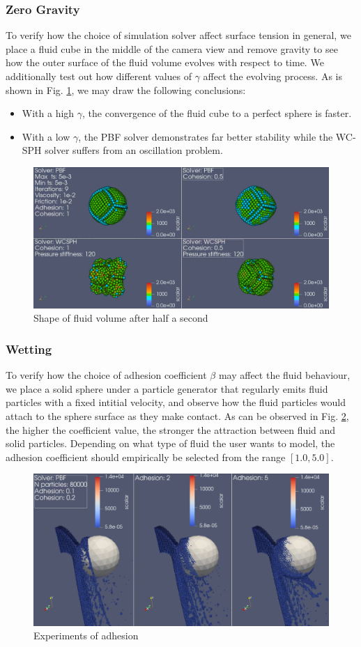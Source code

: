 \documentclass[
	11pt, 
	DIV10,
	ngerman,
	a4paper, 
	oneside, 
	headings=normal, 
	captions=tableheading,
	final, 
	numbers=noenddot
]{scrartcl}
\begin{document}
\subsubsection{Zero Gravity}

To verify how the choice of simulation solver affect surface tension in general, we place a fluid cube in the middle of the camera view and remove gravity to see how the outer surface of the fluid volume evolves with respect to time. We additionally test out how different values of $ \gamma $ affect the evolving process. As is shown in Fig. \ref{fig:no_gravity}, we may draw the following conclusions:

\begin{itemize}
    \item With a high $ \gamma $, the convergence of the fluid cube to a perfect sphere is faster.
    \item With a low $ \gamma $, the PBF solver demonstrates far better stability while the WC-SPH solver suffers from an oscillation problem.
\end{itemize}

\begin{figure}
    \centering
    \includegraphics[width=.6\textwidth]{pics/surface_tension.png}
    \caption{Shape of fluid volume after half a second}
    \label{fig:no_gravity}
\end{figure}

\subsubsection{Wetting}

To verify how the choice of adhesion coefficient $ \beta $ may affect the fluid behaviour, we place a solid sphere under a particle generator that regularly emits fluid particles with a fixed intitial velocity, and observe how the fluid particles would attach to the sphere surface as they make contact. As can be observed in Fig. \ref{fig:wetting}, the higher the coefficient value, the stronger the attraction between fluid and solid particles. Depending on what type of fluid the user wants to model, the adhesion coefficient should empirically be selected from the range $ [1.0, 5.0] $.

\begin{figure}
    \centering
    \includegraphics[width=.6\textwidth]{pics/adhesion.png}
    \caption{Experiments of adhesion}
    \label{fig:wetting}
\end{figure}



\end{document}
